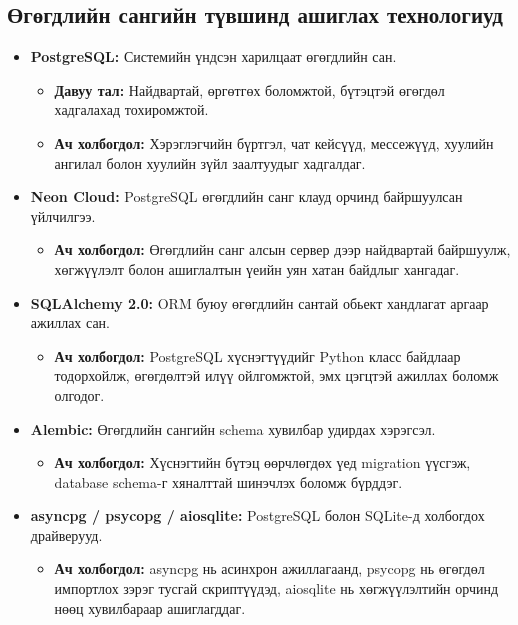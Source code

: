 \subsection{Өгөгдлийн сангийн түвшинд ашиглах технологиуд}

\begin{itemize}

    \item \textbf{PostgreSQL:} Системийн үндсэн харилцаат өгөгдлийн сан.
    \begin{itemize}
        \item \textbf{Давуу тал:} Найдвартай, өргөтгөх боломжтой, бүтэцтэй өгөгдөл хадгалахад тохиромжтой.
        \item \textbf{Ач холбогдол:} Хэрэглэгчийн бүртгэл, чат кейсүүд, мессежүүд, хуулийн ангилал болон хуулийн зүйл заалтуудыг хадгалдаг.
    \end{itemize}

    \item \textbf{Neon Cloud:} PostgreSQL өгөгдлийн санг клауд орчинд байршуулсан үйлчилгээ.
    \begin{itemize}
        \item \textbf{Ач холбогдол:} Өгөгдлийн санг алсын сервер дээр найдвартай байршуулж, хөгжүүлэлт болон ашиглалтын үеийн уян хатан байдлыг хангадаг.
    \end{itemize}

    \item \textbf{SQLAlchemy 2.0:} ORM буюу өгөгдлийн сантай обьект хандлагат аргаар ажиллах сан.
    \begin{itemize}
        \item \textbf{Ач холбогдол:} PostgreSQL хүснэгтүүдийг Python класс байдлаар тодорхойлж, өгөгдөлтэй илүү ойлгомжтой, эмх цэгцтэй ажиллах боломж олгодог.
    \end{itemize}

    \item \textbf{Alembic:} Өгөгдлийн сангийн schema хувилбар удирдах хэрэгсэл.
    \begin{itemize}
        \item \textbf{Ач холбогдол:} Хүснэгтийн бүтэц өөрчлөгдөх үед migration үүсгэж, database schema-г хяналттай шинэчлэх боломж бүрддэг.
    \end{itemize}

    \item \textbf{asyncpg / psycopg / aiosqlite:} PostgreSQL болон SQLite-д холбогдох драйверууд.
    \begin{itemize}
        \item \textbf{Ач холбогдол:} asyncpg нь асинхрон ажиллагаанд, psycopg нь өгөгдөл импортлох зэрэг тусгай скриптүүдэд, aiosqlite нь хөгжүүлэлтийн орчинд нөөц хувилбараар ашиглагддаг.
    \end{itemize}

\end{itemize}

